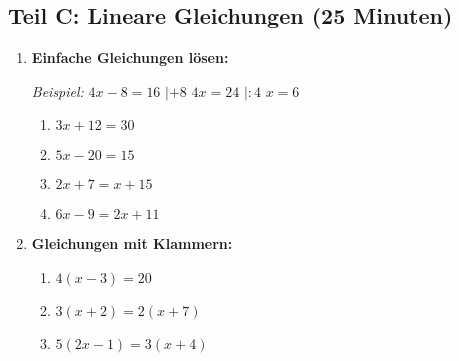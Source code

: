\subsection*{Teil C: Lineare Gleichungen (25 Minuten)}

\begin{enumerate}[label=\arabic*.,resume]

    \item \textbf{Einfache Gleichungen lösen:}

    \textit{Beispiel:} $4x - 8 = 16$ \hspace{1cm} $|+8$ \hspace{1cm} $4x = 24$ \hspace{1cm} $|:4$ \hspace{1cm} $x = 6$

    \vspace{0.5cm}

    \begin{enumerate}[label=\alph*)]
        \item $3x + 12 = 30$

        \vspace{2cm}

        \item $5x - 20 = 15$

        \vspace{2cm}

        \item $2x + 7 = x + 15$

        \vspace{2cm}

        \item $6x - 9 = 2x + 11$

        \vspace{2cm}

    \end{enumerate}

    \item \textbf{Gleichungen mit Klammern:}

    \begin{enumerate}[label=\alph*)]
        \item $4(x - 3) = 20$

        \vspace{2.5cm}

        \item $3(x + 2) = 2(x + 7)$

        \vspace{2.5cm}

        \item $5(2x - 1) = 3(x + 4)$

        \vspace{2.5cm}

    \end{enumerate}

\end{enumerate}